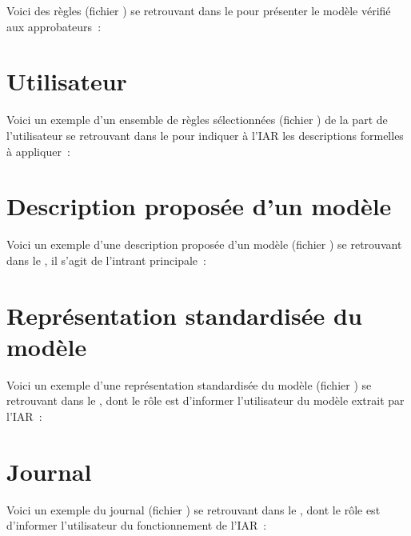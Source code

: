 Voici des règles (fichier  ) se retrouvant dans le  pour présenter le modèle vérifié aux approbateurs~:

 

\section{Utilisateur}

Voici un exemple d'un ensemble de règles sélectionnées (fichier ) de la part de l'utilisateur se retrouvant dans le  pour indiquer à l'IAR les descriptions formelles à appliquer~:

 

\section{Description proposée d'un modèle}

Voici un exemple d'une description proposée d'un modèle (fichier ) se retrouvant dans le , il s'agit de l'intrant principale~:

 

\section{Représentation standardisée du modèle}

Voici un exemple d'une représentation standardisée du modèle (fichier ) se retrouvant dans le , dont le rôle est d'informer l'utilisateur du modèle extrait par l'IAR~:

 

\section{Journal}

Voici un exemple du journal (fichier ) se retrouvant dans le , dont le rôle est d'informer l'utilisateur du fonctionnement de l'IAR~:

 